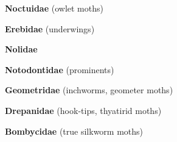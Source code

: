 \documentclass[letterpaper,10pt]{article}
\begin{document}
{%
\makebox[0.6cm]{}  \textbf{Noctuidae} (owlet moths) \par
\makebox[0.6cm]{}  \textbf{Erebidae} (underwings) \par
\makebox[0.6cm]{}  \textbf{Nolidae} \par
\makebox[0.6cm]{}  \textbf{Notodontidae} (prominents) \par
\makebox[0.6cm]{}  \textbf{Geometridae} (inchworms, geometer moths) \par
\makebox[0.6cm]{}  \textbf{Drepanidae} (hook-tips, thyatirid moths) \par
\makebox[0.6cm]{}  \textbf{Bombycidae} (true silkworm moths) \par
}
\end{document}
